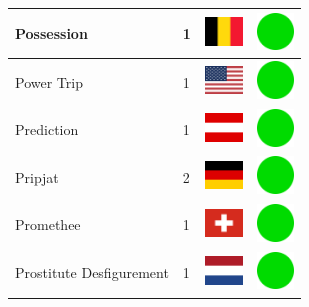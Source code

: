 \documentclass[12pt, a4paper, twoside]{report}
\begin{document}
\begin{center}
\begin{longtable}{|p{5cm}|p{2cm}|p{2cm}|p{2cm}|}
			Possession & 1 & \includegraphics[width=1cm]{4x3/be} & \includegraphics[width=1cm]{likes/y} \\ \hline
			Power Trip & 1 & \includegraphics[width=1cm]{4x3/us} & \includegraphics[width=1cm]{likes/y} \\ \hline
			Prediction & 1 & \includegraphics[width=1cm]{4x3/at} & \includegraphics[width=1cm]{likes/y} \\ \hline
			Pripjat & 2 & \includegraphics[width=1cm]{4x3/de} & \includegraphics[width=1cm]{likes/y} \\ \hline
			Promethee & 1 & \includegraphics[width=1cm]{4x3/ch} & \includegraphics[width=1cm]{likes/y} \\ \hline
			Prostitute Desfigurement & 1 & \includegraphics[width=1cm]{4x3/nl} & \includegraphics[width=1cm]{likes/y} \\ \hline

\end{longtable}
\end{center}
\end{document}
